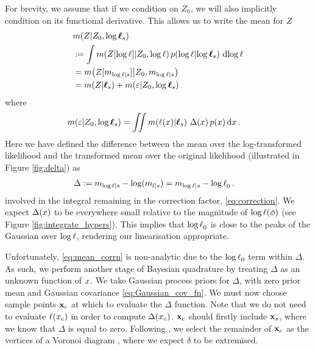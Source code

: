 \documentclass{article}
\begin{document}
For brevity, we assume that if we condition on $Z_0$, we will also implicitly condition on its functional derivative. This allows us to write the mean for  $Z$
%
\begin{align}
& \mean{\If}{Z_0,\tvr_s} \nonumber\\
& \deq \int \mean{Z[\tr]}{Z_0,\tr}
\p{\tr}{\tvr_s}\, \ud \tr 
\nonumber\\
& = \mean{Z[m_{\tr|s}]}{Z_0,m_{\tr|s}} \nonumber\\
& = \mean{\If}{\vr_s} + 
\mean{\varepsilon}{Z_0,\tvr_s}
\label{eq:mean_ev1}
\end{align}
where
\begin{align}\label{eq:mean_corrn}
\mean{\varepsilon}{Z_0,\tvr_s} 
& = \iint \mean{\lfn(\lfv)}{\vr_s}\,
\Delta(\lfv)\,\po{\lfv}\ud\lfv\,.
\end{align}
Here we have defined the difference between the \gpb mean over the log-transformed likelihood and the transformed \gpb mean over the original likelihood (illustrated in Figure \ref{fig:delta}) as
\begin{align}
\Delta & \deq m_{\tr |s} - \log(m_{l|s}) = m_{\tr |s}  - \tr_0 \,.
\end{align}
involved in the integral remaining in the correction factor, \eqref{eq:correction}.
We expect $\Delta(\lfv)$ to be everywhere small relative to the magnitude of $\tr(\phi)$ (see Figure \ref{fig:integrate_hypers}). This implies that
 $\tr_0$ is close to the peaks of the Gaussian over $\tr$, rendering our linearisation appropriate. 

Unfortunately, \eqref{eq:mean_corrn} is non-analytic due to the $\tr_0$ term within $\Delta$. As such, we perform another stage of Bayesian quadrature by treating $\Delta$ as an unknown function of $\lfv$. We take Gaussian process priors for $\Delta$, with zero prior mean and Gaussian covariance \eqref{eq:Gaussian_cov_fn}. We must now choose sample points $\vlfv_c$ at which to evaluate the $\Delta$ function. 
Note that we do not need to evaluate $\lfn(\lfv_c)$ in order to compute $\Delta(\lfv_c)$.
$\vlfv_c$ should firstly include $\vlfv_s$, where we know that $\Delta$ is equal to zero. Following \citet{BQR}, we select the remainder of $\vlfv_c$  as the  vertices of a Voronoi diagram \citep{okabe1997locational}, where we expect $\delta$ to be extremised. 
\end{document}
